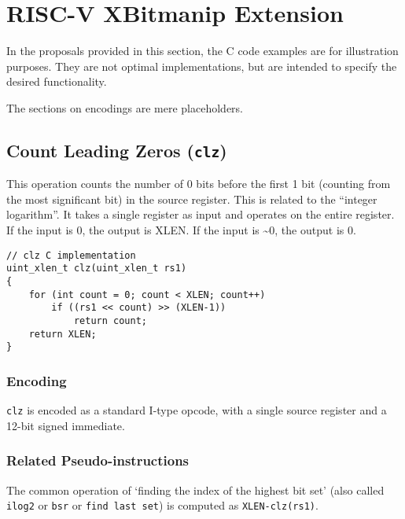 \chapter{RISC-V XBitmanip Extension}\label{risc-v-b-hardware-instructions}

In the proposals provided in this section, the C code examples are for
illustration purposes. They are not optimal implementations, but are
intended to specify the desired functionality.

The sections on encodings are mere placeholders.


\section{Count Leading Zeros (\texttt{clz})}

This operation counts the number of 0 bits before the first 1 bit
(counting from the most significant bit) in the source register. This is
related to the ``integer logarithm''. It takes a single register as
input and operates on the entire register. If the input is 0, the output is
XLEN. If the input is \textasciitilde{}0, the output is 0.

\begin{verbatim}
// clz C implementation
uint_xlen_t clz(uint_xlen_t rs1)
{
    for (int count = 0; count < XLEN; count++)
        if ((rs1 << count) >> (XLEN-1))
            return count;
    return XLEN;
}
\end{verbatim}

\subsection{Encoding}



\texttt{clz} is encoded as a standard I-type opcode, with a single
source register and a 12-bit signed immediate.

\subsection{Related Pseudo-instructions}

The common operation of `finding the index of the highest bit set' (also called
\texttt{ilog2} or \texttt{bsr} or \texttt{find\ last\ set}) is computed as
\texttt{XLEN-clz(rs1)}.

